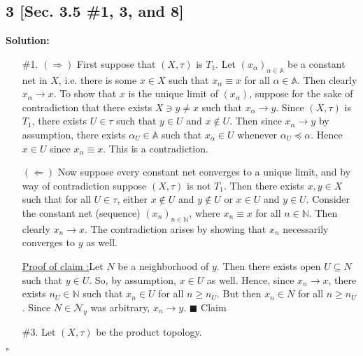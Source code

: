 \documentclass[12pt]{article}
\newcounter{ProofCounter}
\newcounter{ClaimCounter}[ProofCounter]
\newenvironment{Solution}{\stepcounter{ProofCounter}\textbf{Solution:}}{\hfill$\square$}
\newenvironment{claim}[1]{\vspace{1mm}\stepcounter{ClaimCounter}\par\noindent\underline{\bf Claim \theClaimCounter:}\space#1}{}
\newenvironment{claimproof}[1]{\par\noindent\underline{Proof of claim \theClaimCounter:}\space#1}{\hfill $\blacksquare$ Claim \theClaimCounter}
\begin{document}
\subsection*{3 [Sec. 3.5 \#1, 3, and 8]}
\begin{Solution}
  \begin{enumerate}
    \item[\#1.] $(\Rightarrow)$ First suppose that $(X, \tau)$ is $T_1$. Let $(x_\alpha)_{\alpha\in\mathbb{A}}$ be a constant net in $X$, i.e.
      there is some $x \in X$ such that $x_\alpha \equiv x$ for all $\alpha \in \mathbb{A}$. Then clearly $x_\alpha \rightarrow x$. To show that $x$
      is the unique limit of $(x_\alpha)$, suppose for the sake of contradiction that there exists $X \ni y \neq x$ such that $x_\alpha \rightarrow y$.
      Since $(X, \tau)$ is $T_1$, there exists $U \in \tau$ such that $y \in U$ and $x \notin U$. Then since $x_\alpha \rightarrow y$ by assumption,
      there exists $\alpha_U \in \mathbb{A}$ such that $x_\alpha \in U$ whenever $\alpha_U \preceq \alpha$. Hence $x \in U$ since $x_\alpha \equiv x$. 
      This is a contradiction.

      $(\Leftarrow)$ Now suppose every constant net converges to a unique limit, and by way of contradiction suppose $(X, \tau)$ is not $T_1$. Then
      there exists $x, y \in X$ such that for all $U \in \tau$, either $x \notin U$ and $y \notin U$ or $x \in U$ and $y \in U$. Consider the constant
      net (sequence) $(x_n)_{n\in\mathbb{N}}$, where $x_n \equiv x$ for all $n \in \mathbb{N}$. Then clearly $x_n \rightarrow x$. The contradiction
      arises by showing that $x_n$ necessarily converges to $y$ as well.

      \begin{claimproof}
        Let $N$ be a neighborhood of $y$. Then there exists open $U \subseteq N$ such that $y \in U$. So, by assumption, $x \in U$ as well. Hence,
        since $x_n \rightarrow x$, there exists $n_U \in \mathbb{N}$ such that $x_n \in U$ for all $n \geq n_U$. But then $x_n \in N$ for all $n \geq
        n_U$. Since $N \in \mathcal{N}_y$ was arbitrary, $x_n \rightarrow y$.
      \end{claimproof}

    \item[\#3.] Let $(X, \tau)$ be the product topology.


\end{enumerate}
\end{Solution}
\end{document}
